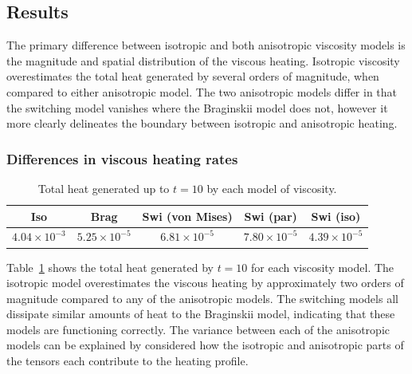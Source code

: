 
\subsection{Results}

\label{sec:slow_null_results}

The primary difference between isotropic and both anisotropic viscosity models is the magnitude and spatial distribution of the viscous heating. Isotropic viscosity overestimates the total heat generated by several orders of magnitude, when compared to either anisotropic model. The two anisotropic models differ in that the switching model vanishes where the Braginskii model does not, however it more clearly delineates the boundary between isotropic and anisotropic heating.

\subsubsection{Differences in viscous heating rates}

\begin{table}[t]
  \centering
  \caption{Total heat generated up to $t=10$ by each model of viscosity.}
  \label{tab:total_heating_slow_null}
  \begin{tabular}{ccccc}
Iso & Brag & Swi (von Mises) & Swi (par) & Swi (iso)\\
\midrule
$4.04 \times 10^{-3}$ & $5.25 \times 10^{-5}$ & $6.81 \times 10^{-5}$ & $7.80 \times 10^{-5}$ & $4.39 \times 10^{-5}$
\end{tabular}
\end{table}

Table~\ref{tab:total_heating_slow_null} shows the total heat generated by $t=10$ for each viscosity model. The isotropic model overestimates the viscous heating by approximately two orders of magnitude compared to any of the anisotropic models. The switching models all dissipate similar amounts of heat to the Braginskii model, indicating that these models are functioning correctly. The variance between each of the anisotropic models can be explained by considered how the isotropic and anisotropic parts of the tensors each contribute to the heating profile.

